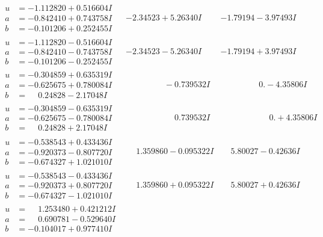 \documentclass[1p]{elsarticle_modified}
\theoremstyle{definition}
\begin{document}
$$\begin{array}{c|c|c}
\begin{aligned}
u &= -1.112820 + 0.516604 I \\
a &= -0.842410 + 0.743758 I \\
b &= -0.101206 + 0.252455 I\end{aligned}
 & -2.34523 + 5.26340 I & -1.79194 - 3.97493 I \\ \hline\begin{aligned}
u &= -1.112820 - 0.516604 I \\
a &= -0.842410 - 0.743758 I \\
b &= -0.101206 - 0.252455 I\end{aligned}
 & -2.34523 - 5.26340 I & -1.79194 + 3.97493 I \\ \hline\begin{aligned}
u &= -0.304859 + 0.635319 I \\
a &= -0.625675 + 0.780084 I \\
b &= \phantom{-}0.24828 - 2.17048 I\end{aligned}
 & \phantom{-0.000000 } -0.739532 I & \phantom{-0.000000 } 0. - 4.35806 I \\ \hline\begin{aligned}
u &= -0.304859 - 0.635319 I \\
a &= -0.625675 - 0.780084 I \\
b &= \phantom{-}0.24828 + 2.17048 I\end{aligned}
 & \phantom{-0.000000 -}0.739532 I & \phantom{-0.000000 -}0. + 4.35806 I \\ \hline\begin{aligned}
u &= -0.538543 + 0.433436 I \\
a &= -0.920373 - 0.807720 I \\
b &= -0.674327 + 1.021010 I\end{aligned}
 & \phantom{-}1.359860 - 0.095322 I & \phantom{-}5.80027 - 0.42636 I \\ \hline\begin{aligned}
u &= -0.538543 - 0.433436 I \\
a &= -0.920373 + 0.807720 I \\
b &= -0.674327 - 1.021010 I\end{aligned}
 & \phantom{-}1.359860 + 0.095322 I & \phantom{-}5.80027 + 0.42636 I \\ \hline\begin{aligned}
u &= \phantom{-}1.253480 + 0.421212 I \\
a &= \phantom{-}0.690781 - 0.529640 I \\
b &= -0.104017 + 0.977410 I\end{aligned}

\end{array}$$
\end{document}
